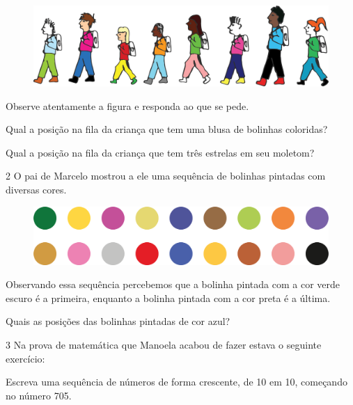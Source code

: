 \begin{figure}[htpb!]
\includegraphics[width=\textwidth]{./media/image27.png}
\end{figure}

Observe atentamente a figura e responda ao que se pede.

\begin{escolha}
\item Qual a posição na fila da criança que tem uma blusa de bolinhas coloridas?

\item Qual a posição na fila da criança que tem três estrelas em seu moletom?
\end{escolha}

\num{2} O pai de Marcelo mostrou a ele uma sequência de bolinhas pintadas com
diversas cores.

\begin{figure}[htpb!]
\includegraphics[width=\textwidth]{./media/image28.png}
\end{figure}

Observando essa sequência percebemos que a bolinha pintada com a cor
verde escuro é a primeira, enquanto a bolinha pintada com a cor preta é a
última.

Quais as posições das bolinhas pintadas de cor azul?

\num{3} Na prova de matemática que Manoela acabou de fazer estava o seguinte exercício:

Escreva uma sequência de números de forma crescente, de 10 em 10, começando no número 705.

